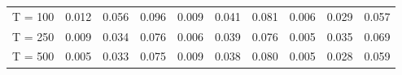 % 
\begin{tabular}{cccccccccc}
  \hline
  \hline
T = 100 & 0.012 & 0.056 & 0.096 & 0.009 & 0.041 & 0.081 & 0.006 & 0.029 & 0.057 \\ 
  T = 250 & 0.009 & 0.034 & 0.076 & 0.006 & 0.039 & 0.076 & 0.005 & 0.035 & 0.069 \\ 
  T = 500 & 0.005 & 0.033 & 0.075 & 0.009 & 0.038 & 0.080 & 0.005 & 0.028 & 0.059 \\ 
   \hline
\end{tabular}
